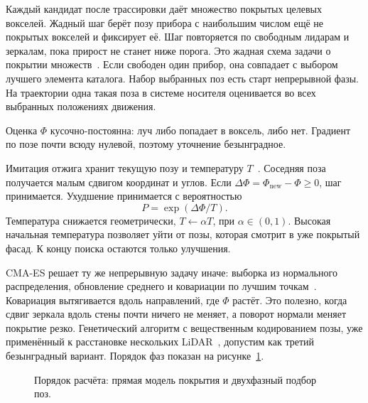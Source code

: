 \documentclass{misisarticle}
\begin{document}
Каждый кандидат после трассировки даёт множество покрытых целевых вокселей. Жадный шаг берёт позу прибора с наибольшим числом ещё не покрытых вокселей и фиксирует её. Шаг повторяется по свободным лидарам и зеркалам, пока прирост не станет ниже порога. Это жадная схема задачи о покрытии множеств~\cite{chvatal1979}. Если свободен один прибор, она совпадает с выбором лучшего элемента каталога. Набор выбранных поз есть старт непрерывной фазы. На траектории одна такая поза в системе носителя оценивается во всех выбранных положениях движения.

Оценка \(\Phi\) кусочно-постоянна: луч либо попадает в воксель, либо нет. Градиент по позе почти всюду нулевой, поэтому уточнение безынградное.

Имитация отжига хранит текущую позу и температуру \(T\)~\cite{kirkpatrick1983}. Соседняя поза получается малым сдвигом координат и углов. Если \(\Delta\Phi = \Phi_{\mathrm{new}} - \Phi \ge 0\), шаг принимается. Ухудшение принимается с вероятностью
\begin{equation}
  P = \exp(\Delta\Phi / T).
  \label{eq:sa}
\end{equation}
Температура снижается геометрически, \(T \leftarrow \alpha T\), при \(\alpha \in (0,1)\). Высокая начальная температура позволяет уйти от позы, которая смотрит в уже покрытый фасад. К концу поиска остаются только улучшения.

CMA-ES решает ту же непрерывную задачу иначе: выборка из нормального распределения, обновление среднего и ковариации по лучшим точкам~\cite{hansen2001}. Ковариация вытягивается вдоль направлений, где \(\Phi\) растёт. Это полезно, когда сдвиг зеркала вдоль стены почти ничего не меняет, а поворот нормали меняет покрытие резко. Генетический алгоритм с вещественным кодированием позы, уже применённый к расстановке нескольких LiDAR~\cite{kini2020}, допустим как третий безынградный вариант. Порядок фаз показан на рисунке~\ref{fig:pipeline}.

\begin{figure}[htbp]
  \centering
  \caption{Порядок расчёта: прямая модель покрытия и двухфазный подбор поз.}
  \label{fig:pipeline}
\end{figure}
\end{document}

